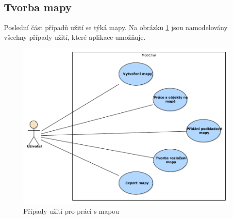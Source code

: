 \documentclass[thesis=B,czech]{resources/FITthesis}[2012/06/26]
\begin{document}
\subsection{Tvorba mapy}
Poslední část případů užití se týká mapy. Na obrázku \ref{fig:uc_mapa} jsou namodelovány všechny případy užití, které aplikace umožňuje.
	\begin{figure}\centering
		\includegraphics[width=1\textwidth]{images/usecase-mapa.pdf}
		\caption[Případy užití pro mapu]{Případy užití pro práci s mapou}				\label{fig:uc_mapa}
	\end{figure}
	
\end{document}
